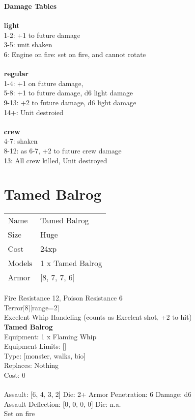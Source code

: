{\bf Damage Tables} \\
\ \\ {\bf light } \\
1-2: +1 to future damage \\
3-5: unit shaken \\
6: Engine on fire: set on fire, and cannot rotate \\
\ \\ {\bf regular } \\
1-4: +1 on future damage, \\
5-8: +1 to future damage, d6 light damage \\
9-13: +2 to future damage, d6 light damage \\
14+: Unit destroied \\
\ \\ {\bf crew } \\
4-7: shaken \\
8-12: as 6-7, +2 to future crew damage \\
13: All crew killed, Unit destroyed \\










\pagebreak\pagebreak

\section{ Tamed Balrog }

\begin{tabular}{ll}
  Name & Tamed Balrog \\
  Size & Huge\\
  Cost & 24xp\\
  Models & 1 x Tamed Balrog\\
  Armor & [8, 7, 7, 6]\\
\end{tabular}

\noindent Fire Resistance 12, Poison Resistance 6\\ 
Terror[8][range=2]\\ 
Excelent Whip Handeling (counts as Excelent shot, +2 to hit)\\ 


{\bf Tamed Balrog } \\
Equipment: 1 x Flaming Whip \\
Equipment Limits: [] \\
Type: [monster, walks, bio] \\
Replaces: Nothing \\
Cost: 0\\
\ \\
Assault: [6, 4, 3, 2] Die: 2+ Armor Penetration: 6 Damage: d6 \\
Assault Deflection: [0, 0, 0, 0] Die: n.a.\\
\indent Set on fire\\ 
 
